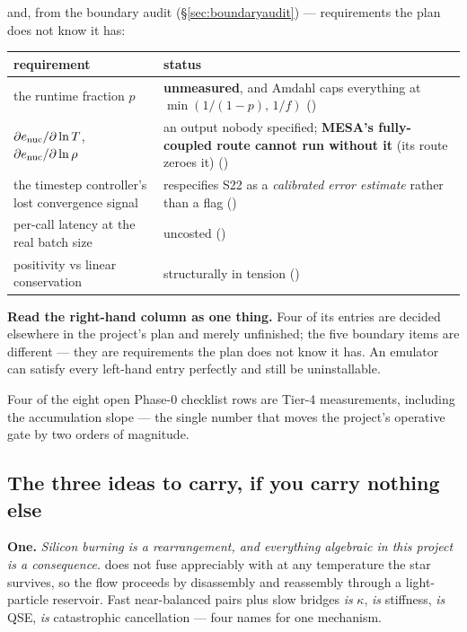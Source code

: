 and, from the boundary audit (\S\ref{sec:boundaryaudit}) --- requirements the
plan does not know it has:

\begin{center}
\begin{tabularx}{\textwidth}{@{}L{5.6cm} Y@{}}
\toprule
\textbf{requirement} & \textbf{status} \\
\midrule
the runtime fraction $p$ & \textbf{unmeasured}, and Amdahl caps everything at
  $\min(1/(1-p),\,1/f)$ () \\
$\partial e_{\mathrm{nuc}}/\partial\ln T$, $\partial e_{\mathrm{nuc}}/\partial\ln\rho$ & an output
  nobody specified; \textbf{MESA's fully-coupled route cannot run without it}
  (its  route zeroes it) () \\
the timestep controller's lost convergence signal & respecifies S22 as a
  \emph{calibrated error estimate} rather than a flag () \\
per-call latency at the real batch size & uncosted () \\
positivity vs linear conservation & structurally in tension () \\
\bottomrule
\end{tabularx}
\end{center}

\textbf{Read the right-hand column as one thing.} Four of its entries are
decided elsewhere in the project's plan and merely unfinished; the five
boundary items are different --- they are requirements the plan does not know
it has. An emulator can satisfy every left-hand entry perfectly and still be
uninstallable.

Four of the eight open Phase-0 checklist rows are Tier-4 measurements,
including the accumulation slope --- the single number that moves the
project's operative gate by two orders of magnitude.

\subsection{The three ideas to carry, if you carry nothing else}
\label{sec:threeideas}

\textbf{One.} \emph{Silicon burning is a rearrangement, and everything
algebraic in this project is a consequence.}  does not fuse
appreciably with  at any temperature the star survives, so the
flow proceeds by disassembly and reassembly through a light-particle
reservoir. Fast near-balanced pairs plus slow bridges \emph{is} $\kappa$,
\emph{is} stiffness, \emph{is} QSE, \emph{is} catastrophic cancellation ---
four names for one mechanism.

